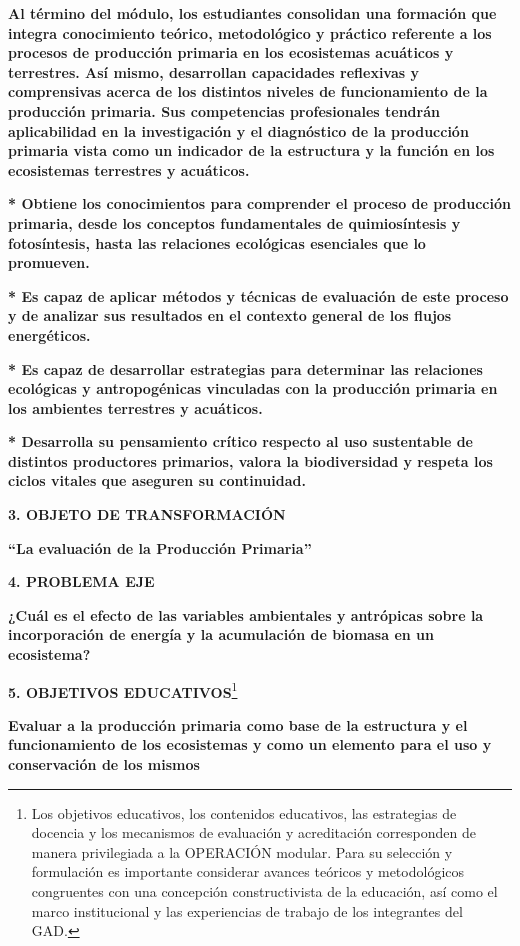 \documentclass[
]{article}
\begin{document}
\textbf{Al término del módulo, los estudiantes consolidan una formación
que integra conocimiento teórico, metodológico y práctico referente a
los procesos de producción primaria en los ecosistemas acuáticos y
terrestres. Así mismo, desarrollan capacidades reflexivas y comprensivas
acerca de los distintos niveles de funcionamiento de la producción
primaria. Sus competencias profesionales tendrán aplicabilidad en la
investigación y el diagnóstico de la producción primaria vista como un
indicador de la estructura y la función en los ecosistemas terrestres y
acuáticos.}

\textbf{* Obtiene los conocimientos para comprender el proceso de
producción primaria, desde los conceptos fundamentales de quimiosíntesis
y fotosíntesis, hasta las relaciones ecológicas esenciales que lo
promueven.}

\textbf{* Es capaz de aplicar métodos y técnicas de evaluación de este
proceso y de analizar sus resultados en el contexto general de los
flujos energéticos.}

\textbf{* Es capaz de desarrollar estrategias para determinar las
relaciones ecológicas y antropogénicas vinculadas con la producción
primaria en los ambientes terrestres y acuáticos.}

\textbf{* Desarrolla su pensamiento crítico respecto al uso sustentable
de distintos productores primarios, valora la biodiversidad y respeta
los ciclos vitales que aseguren su continuidad.}

\textbf{3. OBJETO DE TRANSFORMACIÓN}

\textbf{``La evaluación de la Producción Primaria''}

\textbf{4. PROBLEMA EJE}

\textbf{¿Cuál es el efecto de las variables ambientales y antrópicas
sobre la incorporación de energía y la acumulación de biomasa en un
ecosistema?}

\textbf{5. OBJETIVOS EDUCATIVOS}\footnote{Los objetivos educativos, los
  contenidos educativos, las estrategias de docencia y los mecanismos de
  evaluación y acreditación corresponden de manera privilegiada a la
  OPERACIÓN modular. Para su selección y formulación es importante
  considerar avances teóricos y metodológicos congruentes con una
  concepción constructivista de la educación, así como el marco
  institucional y las experiencias de trabajo de los integrantes del
  GAD.}

\textbf{Evaluar a la producción primaria como base de la estructura y el
funcionamiento de los ecosistemas y como un elemento para el uso y
conservación de los mismos}
\end{document}
